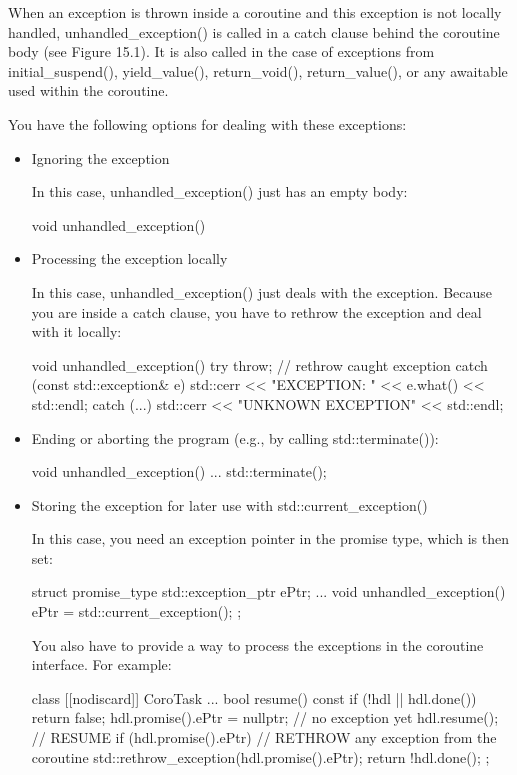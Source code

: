 When an exception is thrown inside a coroutine and this exception is not locally handled, unhandled\_exception() is called in a catch clause behind the coroutine body (see Figure 15.1). It is also called in the case of exceptions from initial\_suspend(), yield\_value(), return\_void(), return\_value(), or any awaitable used within the coroutine.

You have the following options for dealing with these exceptions:

\begin{itemize}
\item 
Ignoring the exception

In this case, unhandled\_exception() just has an empty body:

\begin{cpp}
void unhandled_exception() {
}
\end{cpp}

\item 
Processing the exception locally 

In this case, unhandled\_exception() just deals with the exception. Because you are inside a catch clause, you have to rethrow the exception and deal with it locally:

\begin{cpp}
void unhandled_exception() {
	try {
		throw; // rethrow caught exception
	}
	catch (const std::exception& e) {
		std::cerr << "EXCEPTION: " << e.what() << std::endl;
	}
	catch (...) {
		std::cerr << "UNKNOWN EXCEPTION" << std::endl;
	}
}
\end{cpp}

\item 
Ending or aborting the program (e.g., by calling std::terminate()):

\begin{cpp}
void unhandled_exception() {
	...
	std::terminate();
}
\end{cpp}

\item 
Storing the exception for later use with std::current\_exception() 

In this case, you need an exception pointer in the promise type, which is then set:

\begin{cpp}
struct promise_type {
	std::exception_ptr ePtr;
	...
	void unhandled_exception() {
		ePtr = std::current_exception();
	}
};
\end{cpp}

You also have to provide a way to process the exceptions in the coroutine interface. For example:

\begin{cpp}
class [[nodiscard]] CoroTask {
	...
	bool resume() const {
		if (!hdl || hdl.done()) {
			return false;
		}
		hdl.promise().ePtr = nullptr; // no exception yet
		hdl.resume(); // RESUME
		if (hdl.promise().ePtr) { // RETHROW any exception from the coroutine
			std::rethrow_exception(hdl.promise().ePtr);
		}
		return !hdl.done();
	}
};
\end{cpp}
\end{itemize}

